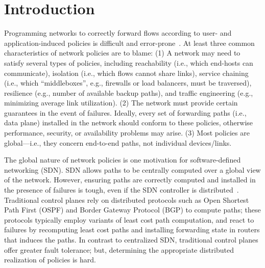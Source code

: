 \section{Introduction}
Programming networks to correctly forward flows according to user- and
application-induced policies is difficult and
error-prone~\cite{troubleshooting, bgpmisconfig}. 
At least three
common characteristics of network policies are to blame: (1) A network
may need to satisfy several types of policies, including reachability
(i.e., which end-hosts can communicate), isolation (i.e., which flows
cannot share links), service chaining (i.e., which ``middleboxes'',
e.g., firewalls or load balancers, must be traversed), resilience
(e.g., number of available backup paths), and traffic engineering
(e.g., minimizing average link utilization). (2) The network must
provide certain guarantees in the event of failures. Ideally, every
set of forwarding paths (i.e., data plane) installed in the network
should conform to these policies, otherwise performance, security, or
availability problems may arise. (3) Most policies are global---i.e.,
they concern end-to-end paths, not individual devices/links.

The global nature of network policies is one motivation for
software-defined networking (SDN). SDN allows paths to be centrally
computed over a global view of the network. However, 
ensuring paths are correctly computed and installed in the
presence of failures is tough, even if the SDN controller is
distributed~\cite{hasdn}.
Traditional control planes rely on distributed protocols such as Open
Shortest Path First (OSPF) and Border Gateway Protocol (BGP) to
compute paths; these protocols typically employ variants of least cost
path computation, and react to failures by recomputing least cost
paths and installing forwarding state in routers that induces the
paths. In contrast to centralized SDN, traditional control planes
offer greater fault tolerance; but, determining the appropriate
distributed realization of policies is hard.

